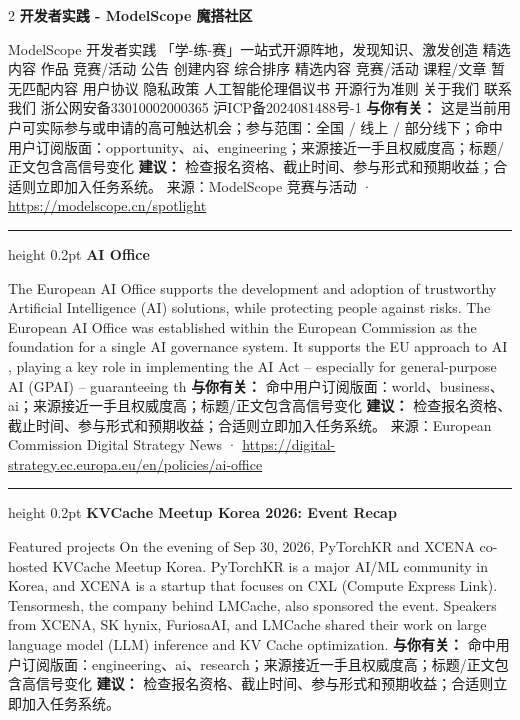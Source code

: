 \documentclass[10.5pt]{ctexart}
\begin{document}
\begin{multicols}{2}
{\large\bfseries 开发者实践 - ModelScope 魔搭社区}\par
ModelScope 开发者实践 「学-练-赛」一站式开源阵地，发现知识、激发创造 精选内容 作品 竞赛/活动 公告 创建内容 综合排序 精选内容 竞赛/活动 课程/文章 暂无匹配内容 用户协议 隐私政策 人工智能伦理倡议书 开源行为准则 关于我们 联系我们 浙公网安备33010002000365 沪ICP备2024081488号-1
\textbf{与你有关：} 这是当前用户可实际参与或申请的高可触达机会；参与范围：全国 / 线上 / 部分线下；命中用户订阅版面：opportunity、ai、engineering；来源接近一手且权威度高；标题/正文包含高信号变化
\textbf{建议：} 检查报名资格、截止时间、参与形式和预期收益；合适则立即加入任务系统。
{\footnotesize\color{ormuted} 来源：ModelScope 竞赛与活动 · \url{https://modelscope.cn/spotlight}}
\vspace{2mm}
\hrule height 0.2pt
\vspace{2mm}
{\large\bfseries AI Office}\par
The European AI Office supports the development and adoption of trustworthy Artificial Intelligence (AI) solutions, while protecting people against risks. The European AI Office was established within the European Commission as the foundation for a single AI governance system. It supports the EU approach to AI , playing a key role in implementing the AI Act – especially for general-purpose AI (GPAI) – guaranteeing th
\textbf{与你有关：} 命中用户订阅版面：world、business、ai；来源接近一手且权威度高；标题/正文包含高信号变化
\textbf{建议：} 检查报名资格、截止时间、参与形式和预期收益；合适则立即加入任务系统。
{\footnotesize\color{ormuted} 来源：European Commission Digital Strategy News · \url{https://digital-strategy.ec.europa.eu/en/policies/ai-office}}
\vspace{2mm}
\hrule height 0.2pt
\vspace{2mm}
{\large\bfseries KVCache Meetup Korea 2026: Event Recap}\par
Featured projects On the evening of Sep 30, 2026, PyTorchKR and XCENA co-hosted KVCache Meetup Korea. PyTorchKR is a major AI/ML community in Korea, and XCENA is a startup that focuses on CXL (Compute Express Link). Tensormesh, the company behind LMCache, also sponsored the event. Speakers from XCENA, SK hynix, FuriosaAI, and LMCache shared their work on large language model (LLM) inference and KV Cache optimization.
\textbf{与你有关：} 命中用户订阅版面：engineering、ai、research；来源接近一手且权威度高；标题/正文包含高信号变化
\textbf{建议：} 检查报名资格、截止时间、参与形式和预期收益；合适则立即加入任务系统。

\end{multicols}
\end{document}
